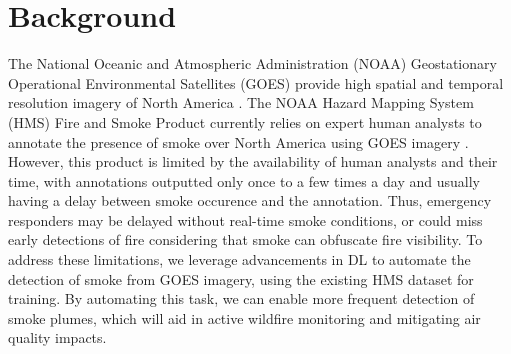 \documentclass{article}
\begin{document}
\section{Background}
The National Oceanic and Atmospheric Administration (NOAA) Geostationary Operational Environmental Satellites (GOES) provide high spatial and temporal resolution imagery of North America \citep{GOESbook}. The NOAA Hazard Mapping System (HMS) Fire and Smoke Product currently relies on expert human analysts to annotate the presence of smoke over North America using GOES imagery \citep{hms}. However, this product is limited by the availability of human analysts and their time, with annotations outputted only once to a few times a day and usually having a delay between smoke occurence and the annotation. Thus, emergency responders may be delayed without real-time smoke conditions, or could miss early detections of fire considering that smoke can obfuscate fire visibility. To address these limitations, we leverage advancements in DL to automate the detection of smoke from GOES imagery, using the existing HMS dataset for training. By automating this task, we can enable more frequent detection of smoke plumes, which will aid in active wildfire monitoring and mitigating air quality impacts.
\end{document}
